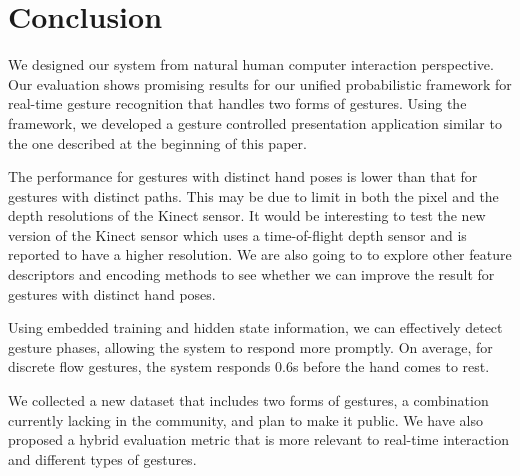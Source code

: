\chapter{Conclusion}
We designed our system from natural human computer interaction perspective.
Our evaluation shows promising results for our unified probabilistic framework
for real-time gesture recognition that handles two forms of gestures. Using the
framework, we developed a gesture controlled presentation application similar to
the one described at the beginning of this paper.

The performance for gestures with distinct hand poses is lower than that for
gestures with distinct paths. This may be due to limit in
both the pixel and the depth resolutions of the Kinect sensor. It would be interesting to test
the new version of the Kinect sensor which uses a time-of-flight depth sensor
and is reported to have a higher resolution. We are also going to to explore
other feature descriptors and encoding methods to see whether we can
improve the result for gestures with distinct hand poses.

Using embedded training and hidden state information, we can effectively
detect gesture phases, allowing the system to respond more promptly. On average,
for discrete flow gestures, the system responds 0.6s before the hand comes to
rest. 

We collected a new dataset that includes two forms of gestures, a
combination currently lacking in the community, and plan to make it
public. We have also proposed a hybrid evaluation metric
that is more relevant to real-time interaction and different types of gestures.